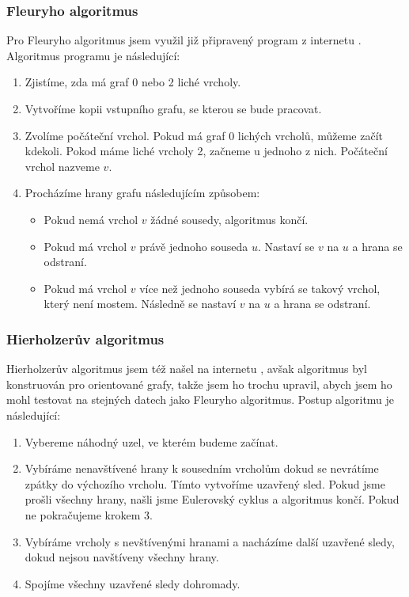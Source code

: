 \documentclass[12pt, a4paper]{article}
\begin{document}
\subsubsection{Fleuryho algoritmus}
Pro Fleuryho algoritmus jsem využil již připravený program z internetu \cite{Geeks2}. Algoritmus programu je následující:
\begin{enumerate}
\item Zjistíme, zda má graf 0 nebo 2 liché vrcholy.
\item Vytvoříme kopii vstupního grafu, se kterou se bude pracovat.
\item Zvolíme počáteční vrchol. Pokud má graf 0 lichých vrcholů, můžeme začít kdekoli. Pokod máme liché vrcholy 2, začneme u jednoho z nich. Počáteční vrchol nazveme $v$.
\item Procházíme hrany grafu následujícím způsobem:
	\begin{itemize}
	\item Pokud nemá vrchol $v$ žádné sousedy, algoritmus končí.
	\item Pokud má vrchol $v$ právě jednoho souseda $u$. Nastaví se $v$ na $u$ a hrana se odstraní.
	\item Pokud má vrchol $v$ více než jednoho souseda vybírá se takový vrchol, který není mostem. Následně se nastaví $v$ na $u$ a hrana se odstraní.
	\end{itemize}
\end{enumerate}

\subsubsection{Hierholzerův algoritmus}
Hierholzerův algoritmus jsem též našel na internetu \cite{Java} , avšak algoritmus byl konstruován pro orientované grafy, takže jsem ho trochu upravil, abych jsem ho mohl testovat na stejných datech jako Fleuryho algoritmus. Postup algoritmu je následující:
\begin{enumerate}
\item Vybereme náhodný uzel, ve kterém budeme začínat.
\item Vybíráme nenavštívené hrany k sousedním vrcholům dokud se nevrátíme zpátky do výchozího vrcholu. Tímto vytvoříme uzavřený sled. Pokud jsme prošli všechny hrany, našli jsme Eulerovský cyklus a algoritmus končí. Pokud ne pokračujeme krokem 3.
\item Vybíráme vrcholy s nevštívenými hranami a nacházíme další uzavřené sledy, dokud nejsou navštíveny všechny hrany.
\item Spojíme všechny uzavřené sledy dohromady.
\end{enumerate}
\end{document}
